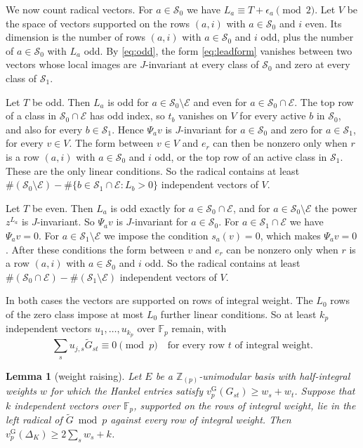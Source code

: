 \documentclass[11pt]{amsart}
\newtheorem{lemma}[theorem]{Lemma}
\theoremstyle{definition}
\theoremstyle{remark}
\numberwithin{equation}{section}
\newcommand{\Z}{\mathbb Z}
\newcommand{\F}{\mathbb F}
\newcommand{\vG}{v_p^{\mathrm G}}
\begin{document}
We now count radical vectors. For $a\in\mathcal S_0$ we have $L_a\equiv T+\epsilon_a\pmod2$. Let $V$ be the space of
vectors supported on the rows $(a,i)$ with $a\in\mathcal S_0$ and $i$ even. Its dimension is the number of rows
$(a,i)$ with $a\in\mathcal S_0$ and $i$ odd, plus the number of $a\in\mathcal S_0$ with $L_a$ odd. By \eqref{eq:odd},
the form \eqref{eq:leadform} vanishes between two vectors whose local images are $J$-invariant at every class of
$\mathcal S_0$ and zero at every class of $\mathcal S_1$.

Let $T$ be odd. Then $L_a$ is odd for $a\in\mathcal S_0\setminus\mathcal E$ and even for $a\in\mathcal S_0\cap\mathcal E$.
The top row of a class in $\mathcal S_0\cap\mathcal E$ has odd index, so $t_b$ vanishes on $V$ for every active $b$
in $\mathcal S_0$, and also for every $b\in\mathcal S_1$. Hence $\Psi_av$ is $J$-invariant for $a\in\mathcal S_0$ and
zero for $a\in\mathcal S_1$, for every $v\in V$. The form between $v\in V$ and $e_r$ can then be nonzero only when $r$
is a row $(a,i)$ with $a\in\mathcal S_0$ and $i$ odd, or the top row of an active class in $\mathcal S_1$. These are
the only linear conditions. So the radical contains at least
$\#(\mathcal S_0\setminus\mathcal E)-\#\{b\in\mathcal S_1\cap\mathcal E:L_b>0\}$ independent vectors of $V$.

Let $T$ be even. Then $L_a$ is odd exactly for $a\in\mathcal S_0\cap\mathcal E$, and for $a\in\mathcal S_0\setminus
\mathcal E$ the power $z^{L_a}$ is $J$-invariant. So $\Psi_av$ is $J$-invariant for $a\in\mathcal S_0$. For
$a\in\mathcal S_1\cap\mathcal E$ we have $\Psi_av=0$. For $a\in\mathcal S_1\setminus\mathcal E$ we impose the condition
$s_a(v)=0$, which makes $\Psi_av=0$. After these conditions the form between $v$ and $e_r$ can be nonzero only when
$r$ is a row $(a,i)$ with $a\in\mathcal S_0$ and $i$ odd. So the radical contains at least
$\#(\mathcal S_0\cap\mathcal E)-\#(\mathcal S_1\setminus\mathcal E)$ independent vectors of $V$.

In both cases the vectors are supported on rows of integral weight. The $L_0$ rows of the zero class impose at most
$L_0$ further linear conditions. So at least $k_p$ independent vectors $u_1,\dots,u_{k_p}$ over $\F_p$ remain, with
\[
 \sum_s u_{j,s}\tilde G_{st}\equiv0\pmod p\quad\text{for every row $t$ of integral weight.}
\]

\begin{lemma}[weight raising]\label{lem:raise}
Let $E$ be a $\Z_{(p)}$-unimodular basis with half-integral weights $w$ for which the Hankel entries satisfy
$\vG(G_{st})\ge w_s+w_t$. Suppose that $k$ independent vectors over $\F_p$, supported on the rows of integral weight,
lie in the left radical of $\tilde G\bmod p$ against every row of integral weight. Then $\vG(\Delta_K)\ge2\sum_sw_s+k$.
\end{lemma}
\end{document}
